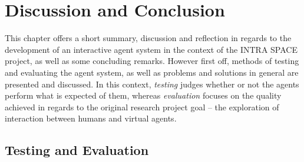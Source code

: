 \documentclass[draft,final]{vutinfth} %
\begin{document}
\chapter{Discussion and Conclusion}
\label{disc}

This chapter offers a short summary, discussion and reflection in regards to the development of an interactive agent system in the context of the INTRA SPACE project, as well as some concluding remarks. 
However first off, methods of testing and evaluating the agent system, as well as problems and solutions in general are presented and discussed. 
In this context, \emph{testing} judges whether or not the agents perform what is expected of them, whereas \emph{evaluation} focuses on the quality achieved in regards to the original research project goal – the exploration of interaction between humans and virtual agents.  

\section{Testing and Evaluation}
\label{testing}
\end{document}
